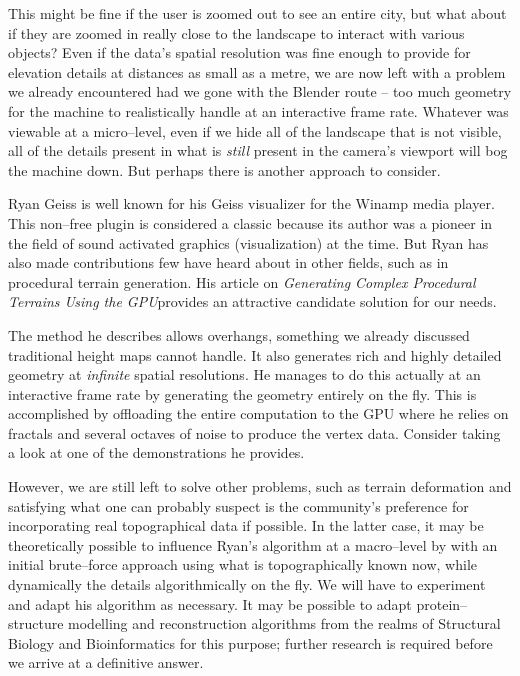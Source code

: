 This might be fine if the user is zoomed out to see an entire city, but what about if they are zoomed in really close to the landscape to interact with various objects? Even if the data's spatial resolution was fine enough to provide for elevation details at distances as small as a metre, we are now left with a problem we already encountered had we gone with the Blender route -- too much geometry for the machine to realistically handle at an interactive frame rate. Whatever was viewable at a micro--level, even if we hide all of the landscape that is not visible, all of the details present in what is {\it still} present in the camera's viewport will bog the machine down. But perhaps there is another approach to consider.

Ryan Geiss is well known for his Geiss visualizer for the Winamp media player. This non--free plugin is considered a classic because its author was a pioneer in the field of sound activated graphics (visualization) at the time. But Ryan has also made contributions few have heard about in other fields, such as in procedural terrain generation. His article on {\it Generating Complex Procedural Terrains Using the GPU} provides an attractive candidate solution for our needs. 

The method he describes allows overhangs, something we already discussed traditional height maps cannot handle. It also generates rich and highly detailed geometry at {\it infinite} spatial resolutions. He manages to do this actually at an interactive frame rate by generating the geometry entirely on the fly. This is accomplished by offloading the entire computation to the GPU where he relies on fractals and several octaves of noise to produce the vertex data. Consider taking a look at one of the demonstrations he provides.

However, we are still left to solve other problems, such as terrain deformation and satisfying what one can probably suspect is the community's preference for incorporating real topographical data if possible. In the latter case, it may be theoretically possible to influence Ryan's algorithm at a macro--level by  with an initial brute--force approach using what is topographically known now, while dynamically  the details algorithmically on the fly. We will have to experiment and adapt his algorithm as necessary. It may be possible to adapt protein--structure modelling and reconstruction algorithms from the realms of Structural Biology and Bioinformatics for this purpose; further research is required before we arrive at a definitive answer.

